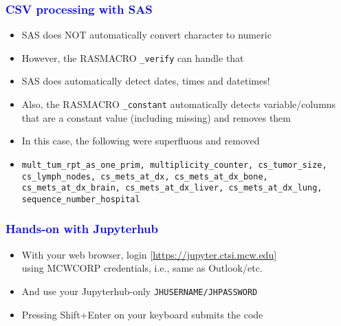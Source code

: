 \documentclass[11pt,pdftex,dvipsnames,usenames]{beamer}
\begin{document}
\begin{frame}[fragile]\frametitle{\bf\textcolor{blue}{CSV processing with SAS}}
\begin{itemize}
\item SAS does NOT automatically convert character to numeric
\item However, the RASMACRO \texttt{\_verify} can handle that
\item SAS does automatically detect dates, times and datetimes!
\item Also, the RASMACRO \texttt{\_constant} automatically detects
variable/columns that are a constant value (including missing) and
removes them
\item In this case, the following were superfluous and removed
\item \texttt{mult\_tum\_rpt\_as\_one\_prim, multiplicity\_counter, 
cs\_tumor\_size, cs\_lymph\_nodes, cs\_mets\_at\_dx, cs\_mets\_at\_dx\_bone, 
cs\_mets\_at\_dx\_brain, cs\_mets\_at\_dx\_liver, cs\_mets\_at\_dx\_lung, 
sequence\_number\_hospital}
\end{itemize}


\end{frame}

\begin{frame}[fragile]\frametitle{\bf\textcolor{blue}{Hands-on with Jupyterhub}}
\begin{itemize}
\item With your web browser, login
  \textcolor{PineGreen}{[\href{https://jupyter.ctsi.mcw.edu}{https://jupyter.ctsi.mcw.edu}]} \\
using MCWCORP credentials, i.e., same as Outlook/etc.
\item And use your Jupyterhub-only \texttt{JHUSERNAME/JHPASSWORD}
\item Pressing Shift+Enter on your keyboard submits the code
\end{itemize}

\end{frame}
\end{document}
